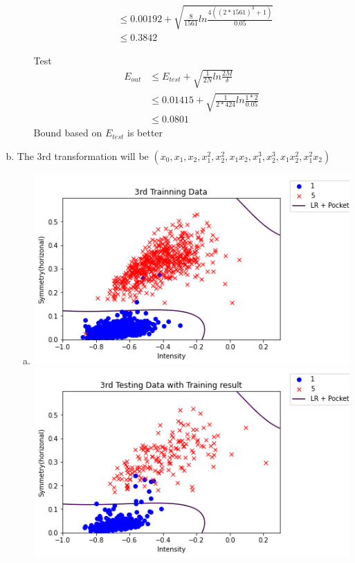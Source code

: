 \documentclass{article}
\def\math#1{$#1$}
\begin{document}
\begin{enumerate}[a)]
\begin{itemize}
\begin{equation}
\begin{split}
                        &\leq 0.00192 + \sqrt{\frac{8}{1561}ln\frac{4((2 * 1561)^3 + 1)}{0.05}} \\
                        &\leq 0.3842
                    \end{split}
                \end{equation}
            \item [Test] \begin{equation}
                    \begin{split}
                        E_{out} &\leq E_{test} + \sqrt{\frac{1}{2N}ln\frac{2M}{\delta}} \\
                        &\leq 0.01415 + \sqrt{\frac{1}{2 * 424}ln\frac{1 * 2}{0.05}} \\
                        &\leq 0.0801
                    \end{split}
                \end{equation}
            Bound based on \math{E_{test}} is better
        \end{itemize}
    \item The 3rd transformation will be \math{(x_0, x_1, x_2, x_1^2, x_2^2, x_1x_2, x_1^3, x_2^3, x_1x_2^2, x_1^2x_2)}
        \begin{enumerate}[a)]
            \item \includegraphics[]{1/3} \includegraphics[]{1/4}

\end{enumerate}
\end{enumerate}
\end{document}
